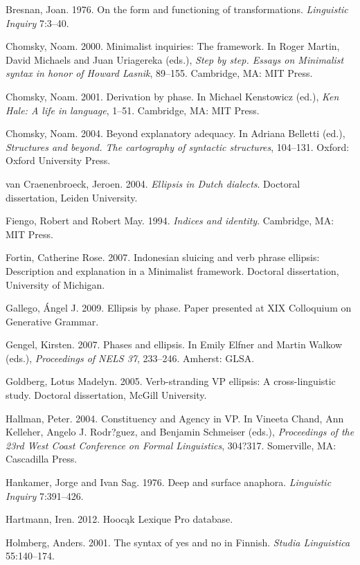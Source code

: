 \documentclass[output=paper]{LSP/langsci}
\begin{document}
\begin{reflist}

Bresnan, Joan. 1976. On the form and functioning of transformations. \emph{Linguistic Inquiry} 7:3--40.

Chomsky, Noam. 2000. Minimalist inquiries: The framework. In Roger Martin, David Michaels and Juan Uriagereka (eds.), \emph{Step by step. Essays on Minimalist syntax in honor of Howard Lasnik}, 89--155. Cambridge, MA: MIT Press.

Chomsky, Noam. 2001. Derivation by phase. In Michael Kenstowicz (ed.), \emph{Ken Hale: A life in language}, 1--51. Cambridge, MA: MIT Press.

Chomsky, Noam. 2004. Beyond explanatory adequacy. In Adriana Belletti (ed.), \emph{Structures and beyond. The cartography of syntactic structures}, 104--131. Oxford: Oxford University Press.

van Craenenbroeck, Jeroen. 2004. \emph{Ellipsis in Dutch dialects}. Doctoral dissertation, Leiden University.

Fiengo, Robert and Robert May. 1994. \emph{Indices and identity}. Cambridge, MA: MIT Press.

Fortin, Catherine Rose. 2007. Indonesian sluicing and verb phrase ellipsis: Description and explanation in a Minimalist framework. Doctoral dissertation, University of Michigan. 

Gallego, \'{A}ngel J. 2009. Ellipsis by phase. Paper presented at XIX Colloquium on Generative Grammar. 

Gengel, Kirsten. 2007. Phases and ellipsis. In Emily Elfner and Martin Walkow (eds.), \emph{Proceedings of NELS 37}, 233--246. Amherst: GLSA. 

Goldberg, Lotus Madelyn. 2005. Verb-stranding VP ellipsis: A cross-linguistic study. Doctoral dissertation, McGill University. 

Hallman, Peter. 2004. Constituency and Agency in VP. In Vineeta Chand, Ann Kelleher, Angelo J. Rodr?guez, and Benjamin Schmeiser (eds.), \emph{Proceedings of the 23rd West Coast Conference on Formal Linguistics}, 304?317. Somerville, MA: Cascadilla Press.

Hankamer, Jorge and Ivan Sag. 1976. Deep and surface anaphora. \emph{Linguistic Inquiry} 7:391--426.

Hartmann, Iren. 2012. Hoocąk Lexique Pro database.

Holmberg, Anders. 2001. The syntax of yes and no in Finnish. \emph{Studia Linguistica} 55:140--174.


\end{reflist}
\end{document}

